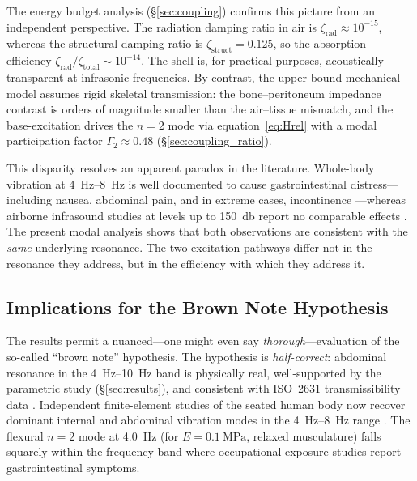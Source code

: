 The energy budget analysis (\S\ref{sec:coupling}) confirms this picture from
an independent perspective.  The radiation damping ratio in air is
$\zeta_{\mathrm{rad}} \approx 10^{-15}$, whereas the structural damping
ratio is $\zeta_{\mathrm{struct}} = 0.125$, so the absorption efficiency
$\zeta_{\mathrm{rad}} / \zeta_{\mathrm{total}} \sim 10^{-14}$.  The shell
is, for practical purposes, acoustically transparent at infrasonic
frequencies.  By contrast, the upper-bound mechanical model assumes rigid
skeletal transmission: the bone--peritoneum impedance contrast is orders of
magnitude smaller than the air--tissue mismatch, and the base-excitation
drives the $n = 2$ mode via equation~\ref{eq:Hrel} with a modal
participation factor $\Gamma_2 \approx 0.48$
(\S\ref{sec:coupling_ratio}).

This disparity resolves an apparent paradox in the literature.  Whole-body
vibration at \SIrange{4}{8}{\hertz} is well documented to cause
gastrointestinal distress---including nausea, abdominal pain, and in
extreme cases, incontinence \cite{Griffin1990,mansfield2005human,Seidel1986,Ishitake2002,Krajnak2018}---whereas
airborne infrasound studies at levels up to \SI{150}{\decibel} report no
comparable effects \cite{Moller2004,Leventhall2007}.  The present modal
analysis shows that both observations are consistent with the \emph{same}
underlying resonance.  The two excitation pathways differ not in the
resonance they address, but in the efficiency with which they address it.

\subsection{Implications for the Brown Note Hypothesis}
\label{sec:disc:brownnote}

The results permit a nuanced---one might even say \emph{thorough}---evaluation
of the so-called ``brown note''
hypothesis.  The hypothesis is \emph{half-correct}: abdominal resonance in the
\SIrange{4}{10}{\hertz} band is physically real, well-supported by the
parametric study (\S\ref{sec:results}), and consistent with ISO~2631
transmissibility data \cite{iso2631,Kitazaki1998}.  Independent
finite-element studies of the seated human body now recover dominant internal
and abdominal vibration modes in the \SIrange{4}{8}{\hertz} range
\cite{Dong2024}.  The flexural
$n = 2$ mode at \SI{4.0}{\hertz} (for $E = \SI{0.1}{\mega\pascal}$, relaxed
musculature) falls squarely within the frequency band where occupational
exposure studies report gastrointestinal symptoms.

